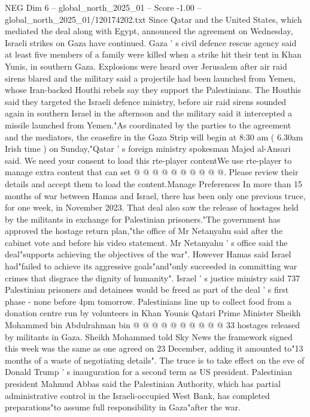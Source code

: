 \begin{textsample}{NEG Dim 6 – global\_north\_2025\_01 – Score -1.00 – global\_north\_2025\_01/120174202.txt}  \label{ex:f6_neg_185}
Since Qatar and the United States, which mediated the deal along with Egypt, announced the agreement on Wednesday, Israeli strikes on Gaza have continued.
Gaza ' s civil defence rescue agency said at least five members of a family were killed when a strike hit their tent in Khan Yunis, in southern Gaza.
Explosions were heard over Jerusalem after air raid sirens blared and the military said a projectile had been launched from Yemen, whose Iran-backed Houthi rebels say they support the Palestinians.
The Houthis said they targeted the Israeli defence ministry, before air raid sirens sounded again in southern Israel in the afternoon and the military said it intercepted a missile launched from Yemen."As coordinated by the parties to the agreement and the mediators, the ceasefire in the Gaza Strip will begin at 8:30 am ( 6.30am Irish time ) on Sunday,"Qatar ' s foreign ministry spokesman Majed al-Ansari said.
We need your consent to load this rte-player contentWe use rte-player to manage extra content that can set @ @ @ @ @ @ @ @ @ @.
Please review their details and accept them to load the content.Manage Preferences In more than 15 months of war between Hamas and Israel, there has been only one previous truce, for one week, in November 2023.
That deal also saw the release of hostages held by the militants in exchange for Palestinian prisoners."The government has approved the hostage return plan,"the office of Mr Netanyahu said after the cabinet vote and before his video statement.
Mr Netanyahu ' s office said the deal"supports achieving the objectives of the war".
However Hamas said Israel had"failed to achieve its aggressive goals"and"only succeeded in committing war crimes that disgrace the dignity of humanity".
Israel ' s justice ministry said 737 Palestinian prisoners and detainees would be freed as part of the deal ' s first phase - none before 4pm tomorrow.
Palestinians line up to collect food from a donation centre run by volunteers in Khan Younis Qatari Prime Minister Sheikh Mohammed bin Abdulrahman bin @ @ @ @ @ @ @ @ @ @ 33 hostages released by militants in Gaza.
Sheikh Mohammed told Sky News the framework signed this week was the same as one agreed on 23 December, adding it amounted to"13 months of a waste of negotiating details".
The truce is to take effect on the eve of Donald Trump ' s inauguration for a second term as US president.
Palestinian president Mahmud Abbas said the Palestinian Authority, which has partial administrative control in the Israeli-occupied West Bank, has completed preparations"to assume full responsibility in Gaza"after the war.

\end{textsample}
